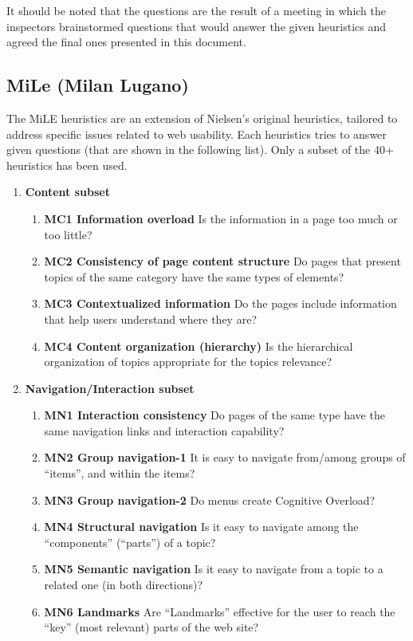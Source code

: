 It should be noted that the questions are the result of a meeting in which the inspectors brainstormed questions that would answer the given heuristics and agreed the final ones presented in this document.

\subsection{MiLe (Milan Lugano)}
The MiLE heuristics are an extension of Nielsen’s original heuristics, tailored to address specific issues related to web usability. Each heuristics tries to answer given questions (that are shown in the following list). Only a subset of the 40+ heuristics has been used.
\begin{enumerate}
	\item \textbf{Content subset}
		\begin{enumerate}
			\item \textbf{MC1 Information overload} Is the information in a page too much or too little?
			\item \textbf{MC2 Consistency of page content structure} Do pages that present topics of the same category have the same types of elements?
			\item \textbf{MC3 Contextualized information} Do the pages include information that help users understand where they are?
			\item \textbf{MC4 Content organization (hierarchy)} Is the hierarchical organization of topics appropriate for the topics relevance?
		\end{enumerate}

	\item \textbf{Navigation/Interaction subset}
		\begin{enumerate}
			\item \textbf{MN1 Interaction consistency} Do pages of the same type have the same navigation links and interaction capability?
			\item \textbf{MN2 Group navigation-1} It is easy to navigate from/among groups of “items”, and within the items?
			\item \textbf{MN3 Group navigation-2} Do menus create Cognitive Overload?
			\item \textbf{MN4 Structural navigation} Is it easy to navigate among the “components” (“parts”) of a topic?
			\item \textbf{MN5 Semantic navigation} Is it easy to navigate from a topic to a related one (in both directions)?
			\item \textbf{MN6 Landmarks} Are “Landmarks” effective for the user to reach the “key” (most relevant) parts of the web site?
		\end{enumerate}


\end{enumerate}
